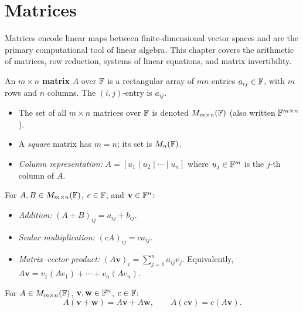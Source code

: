 \section{Matrices}
\label{sec:matrices}

Matrices encode linear maps between finite-dimensional vector spaces and are
the primary computational tool of linear algebra.  This chapter covers the
arithmetic of matrices, row reduction, systems of linear equations, and matrix
invertibility.

\begin{defbox}
An $m\times n$ \textbf{matrix} $A$ over $\mathbb{F}$ is a rectangular array of $mn$
entries $a_{ij}\in\mathbb{F}$, with $m$ rows and $n$ columns.  The $(i,j)$-entry is
$a_{ij}$.

\begin{itemize}
    \item The set of all $m\times n$ matrices over $\mathbb{F}$ is denoted
          $M_{m\times n}(\mathbb{F})$ (also written $\mathbb{F}^{m\times n}$).
    \item A \emph{square} matrix has $m=n$; its set is $M_{n}(\mathbb{F})$.
    \item \emph{Column representation:}
          $A = [u_1 \mid u_2 \mid \cdots \mid u_n]$
          where $u_j\in\mathbb{F}^m$ is the $j$-th column of $A$.
\end{itemize}
\end{defbox}

\begin{defbox}
For $A,B\in M_{m\times n}(\mathbb{F})$, $c\in\mathbb{F}$, and $\mathbf{v}\in\mathbb{F}^n$:
\begin{itemize}
    \item \emph{Addition:} $(A+B)_{ij} = a_{ij}+b_{ij}$.
    \item \emph{Scalar multiplication:} $(cA)_{ij} = ca_{ij}$.
    \item \emph{Matrix–vector product:}
          $(A\mathbf{v})_i = \displaystyle\sum_{j=1}^n a_{ij}v_j$.
          Equivalently, $A\mathbf{v} = v_1(Ae_1)+\cdots+v_n(Ae_n)$.
\end{itemize}
\end{defbox}

\begin{propbox}
For $A\in M_{m\times n}(\mathbb{F})$, $\mathbf{v},\mathbf{w}\in\mathbb{F}^n$, $c\in\mathbb{F}$:
\[
    A(\mathbf{v}+\mathbf{w}) = A\mathbf{v}+A\mathbf{w}, \qquad
    A(c\mathbf{v}) = c(A\mathbf{v}).
\]
\end{propbox}

